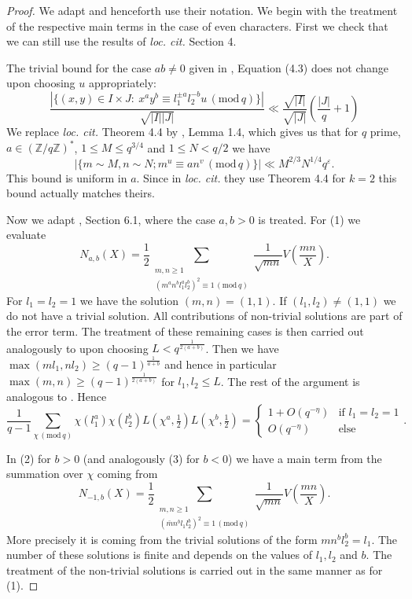 \documentclass[12pt]{amsart}
\theoremstyle{plain}
\theoremstyle{definition}
\theoremstyle{remark}
\numberwithin{equation}{section}
\newcommand{\ZZ}{\mathbb{Z}}
\newcommand{\mods}[1]{\,(\mathrm{mod}\,{#1})}
\renewcommand{\geq}{\geqslant}
\renewcommand{\leq}{\leqslant}
\begin{document}
\begin{proof}
We adapt \cite{FKMsecondmom} and henceforth use their notation.
We begin with the treatment of the respective main terms in the case of even characters. First we check that we can still use the results of \emph{loc. cit.} Section 4.


The trivial bound for the case $ ab\neq 0$ given in \cite{FKMsecondmom}, Equation (4.3) does not change upon choosing $u$ appropriately: 
$$\frac{|\{(x,y)\in I\times J :\ x^ay^b\equiv l_1^{\pm a}l_2^{-b}u \mods q\}|}{\sqrt{|I||J|}}\ll \frac{\sqrt{|I|}}{\sqrt{|J|}}\left(\frac{|J|}{q}+1\right)$$
We replace \emph{loc. cit.} Theorem 4.4 by \cite{Nunes_2017}, Lemma 1.4, which gives us that for $q$ prime, $a\in (\ZZ/q\ZZ)^\ast$, $1\leq M\leq q^{3/4}$ and $1\leq N<q/2$ we have
\begin{equation}\label{eq: Nunes replacement for pierce}
    |\{m\sim M, n\sim N; m^u\equiv an^v \mods q\}| \ll M^{2/3}N^{1/4}q^\varepsilon.
\end{equation}
This bound is uniform in $a$. 
Since in \emph{loc. cit.} they use Theorem 4.4 for $k=2$ this bound actually matches theirs. 
    
 Now we adapt \cite{FKMsecondmom}, Section 6.1, where the case $a,b>0$ is treated.
    For (1) we evaluate
    $$    N_{a,b}(X)=\frac 12 \sum_{\substack{m,n\geq 1\\ (m^an^bl_1^al_2^b)^2\equiv 1\mods q}}\frac{1}{\sqrt{mn}}V\left(\frac{mn}{X}\right) .$$
For $l_1=l_2=1$ we have the solution $(m,n)=(1,1)$. If $(l_1,l_2)\neq (1,1)$ we do not have a trivial solution. All contributions of non-trivial solutions are part of the error term. The treatment of these remaining cases is then carried out analogously to \cite{FKMsecondmom} upon choosing $L<q^{\frac{1}{2(a+b)}}$. Then we have $\max (ml_1,nl_2)\geq (q-1)^{\frac{1}{a+b}}$ and hence in particular $\max (m,n)\geq (q-1)^{\frac{1}{2(a+b)}}$ for $l_1,l_2\leq L$. The rest of the argument is analogous to \cite{FKMsecondmom}. 
Hence 
$$\frac{1}{q-1}\sum_{\chi\mods q}\chi(l_1^a)\chi(l_2^b)L(\chi^a,\tfrac 12)L(\chi^b,\tfrac 12)=\begin{cases} 1 + O(q^{-\eta}) & \text{if }l_1=l_2=1 \\ 
       O(q^{-\eta}) &\text{else} \end{cases}.$$


In (2) for $b>0$ (and analogously (3) for $b<0$) we have a main term from the summation over $\chi$ coming from 
$$N_{-1,b}(X)=\frac12\sum_{\substack{m,n\geq 1\\ (\bar m n^bl_1l_2^b)^2\equiv 1\mods q}}\frac{1}{\sqrt{mn}}V\left(\frac{mn}{X}\right).$$
More precisely it is coming from the trivial solutions of the form $mn^bl_2^b=l_1$. The number of these solutions is finite and depends on the values of $l_1,l_2$ and $b$. The treatment of the non-trivial solutions is carried out in the same manner as for (1).





\end{proof}
\end{document}

